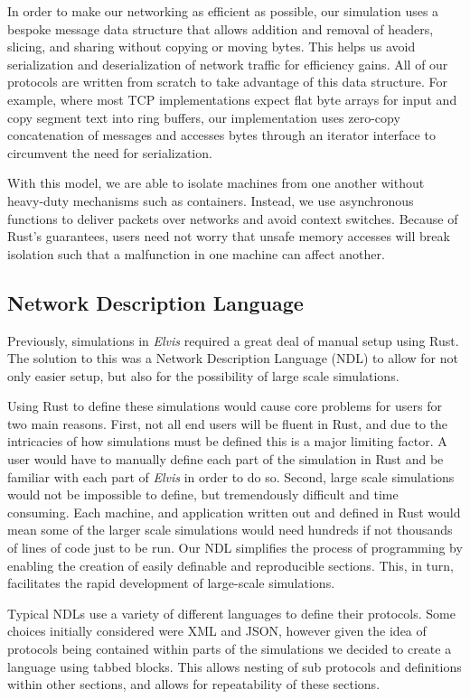 \documentclass[journal]{IEEEtran} %
\newcommand{\elvis}{\textit{Elvis}}
\begin{document}
In order to make our networking as efficient as possible, our simulation uses a bespoke message data structure that allows addition and removal of headers, slicing, and sharing without copying or moving bytes. This helps us avoid serialization and deserialization of network traffic for efficiency gains. All of our protocols are written from scratch to take advantage of this data structure. For example, where most TCP implementations expect flat byte arrays for input and copy segment text into ring buffers, our implementation uses zero-copy concatenation of messages and accesses bytes through an iterator interface to circumvent the need for serialization.

With this model, we are able to isolate machines from one another without heavy-duty mechanisms such as containers. Instead, we use asynchronous functions to deliver packets over networks and avoid context switches. Because of Rust’s guarantees, users need not worry that unsafe memory accesses will break isolation such that a malfunction in one machine can affect another. 


\subsection{Network Description Language}

Previously, simulations in \elvis{} required a great deal of manual setup using Rust. The solution to this was a Network Description Language (NDL) to allow for not only easier setup, but also for the possibility of large scale simulations.

Using Rust to define these simulations would cause core problems for users for two main reasons. First, not all end users will be fluent in Rust, and due to the intricacies of how simulations must be defined this is a major limiting factor. A user would have to manually define each part of the simulation in Rust and be familiar with each part of \elvis{} in order to do so. Second, large scale simulations would not be impossible to define, but tremendously difficult and time consuming. Each machine, and application written out and defined in Rust would mean some of the larger scale simulations would need hundreds if not thousands of lines of code just to be run. Our NDL simplifies the process of programming by enabling the creation of easily definable and reproducible sections. This, in turn, facilitates the rapid development of large-scale simulations.

Typical NDLs use a variety of different languages to define their protocols. Some choices initially considered were XML and JSON, however given the idea of protocols being contained within parts of the simulations we decided to create a language using tabbed blocks. This allows nesting of sub protocols and definitions within other sections, and allows for repeatability of these sections.
\end{document}

